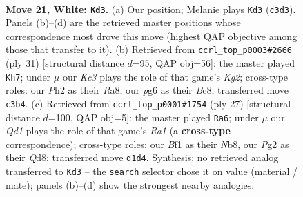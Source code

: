 \documentclass[11pt]{article}
\begin{document}
\clearpage

\begin{figure}[p]\centering
\begin{subfigure}{0.46\textwidth}\centering
\resizebox{\linewidth}{!}{%
\newchessgame
\chessboard[
  setfen={r1b2kr1/1p1nbp1p/p3n1p1/2Ppq3/8/1NK1BPN1/PP4PP/1R1Q1B1R w - - 1 21},
  showmover=false,
  pgfstyle=straightmove, color=movearrow, markmove={c3-d3}
]}
\caption{}
\end{subfigure}\hfill
\begin{subfigure}{0.46\textwidth}\centering
\resizebox{\linewidth}{!}{%
\newchessgame
\chessboard[
  setfen={r1bq1r2/1pp2pk1/1nnp2p1/1N5p/2P1P2P/1PQ2P2/4N1P1/3RKB1R b K - 1 16},
  showmover=false,
  pgfstyle=straightmove, color=movearrow, markmove={g7-h7}
]}
\caption{}
\end{subfigure}
\\[4pt]
\begin{subfigure}{0.46\textwidth}\centering
\resizebox{\linewidth}{!}{%
\newchessgame
\chessboard[
  setfen={rn1q1rk1/3b1pbp/3Q1np1/p3p3/1p2P2P/1N2BP2/PPP1N1P1/2KR1B1R b - - 0 14},
  showmover=false,
  pgfstyle=straightmove, color=movearrow, markmove={a8-a6}
]}
\caption{}
\end{subfigure}\hfill

\caption{\textbf{Move 21, White: \texttt{Kd3}.} (a) Our position; Melanie plays \texttt{Kd3} (\texttt{c3d3}). Panels (b)--(d) are the retrieved master positions whose correspondence most drove this move (highest QAP objective among those that transfer to it). (b) Retrieved from \texttt{ccrl\_top\_p0003\#2666} (ply 31) [structural distance $d$=95, QAP obj=56]: the master played \texttt{Kh7}; under $\mu$ our \emph{Kc3} plays the role of that game's \emph{Kg2}; cross-type roles: our \emph{P}h2 as their \emph{R}a8, our \emph{p}g6 as their \emph{B}c8; transferred move \texttt{c3b4}. (c) Retrieved from \texttt{ccrl\_top\_p0001\#1754} (ply 27) [structural distance $d$=100, QAP obj=5]: the master played \texttt{Ra6}; under $\mu$ our \emph{Qd1} plays the role of that game's \emph{Ra1} (a \textbf{cross-type} correspondence); cross-type roles: our \emph{B}f1 as their \emph{N}b8, our \emph{P}g2 as their \emph{Q}d8; transferred move \texttt{d1d4}. Synthesis: no retrieved analog transferred to \texttt{Kd3} -- the \texttt{search} selector chose it on value (material / mate); panels (b)--(d) show the strongest nearby analogies.}
\label{fig:thought-m40}
\end{figure}

\clearpage
\end{document}
